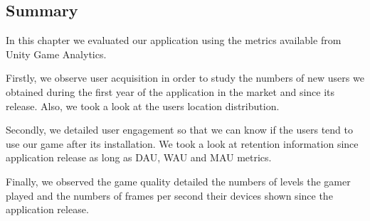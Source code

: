 \subsection{Summary}
In this chapter we evaluated our application using the metrics available from Unity Game Analytics.

Firstly, we observe user acquisition in order to study the numbers of new users we obtained during the first year of the application in the market and since its release. Also, we took a look at the users location distribution.

Secondly, we detailed user engagement so that we can know if the users tend to use our game after its installation. We took a look at retention information since application release as long as DAU, WAU and MAU metrics.

Finally, we observed the game quality detailed the numbers of levels the gamer played and the numbers of frames per second their devices shown since the application release.


